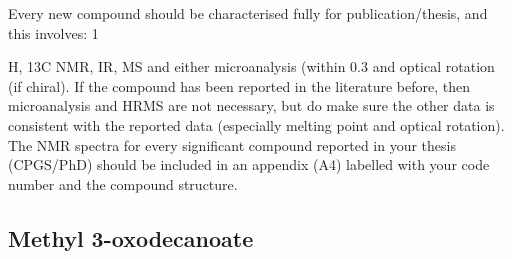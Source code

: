 Every new compound should be
characterised fully for publication/thesis, and this involves: 1

H, 13C NMR, IR, MS and either
microanalysis (within 0.3%
and optical rotation (if chiral). If the compound has been reported in the literature before, then
microanalysis and HRMS are not necessary, but do make sure the other data is consistent with
the reported data (especially melting point and optical rotation). The NMR spectra for every
significant compound reported in your thesis (CPGS/PhD) should be included in an appendix (A4)
labelled with your code number and the compound structure.

\subsection{Methyl 3-oxodecanoate }


\begin{scheme}[H]
	\begin{center}
	\end{center}
\end{scheme}

